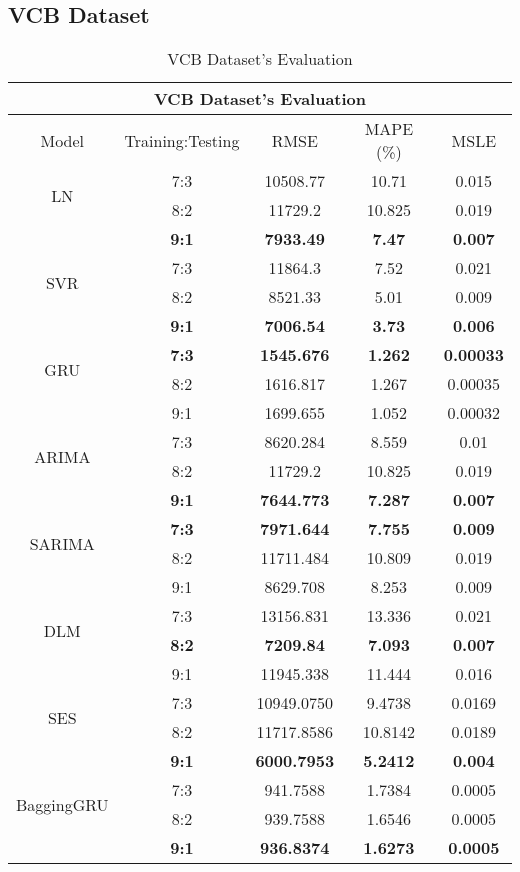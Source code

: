\documentclass{ieeeojies}
\begin{document}
\subsection{VCB Dataset} 
\begin{table}[H]
    \centering
    \begin{tabular}{|c|c|c|c|c|}
         \hline
         \multicolumn{5}{|c|}{\textbf{VCB Dataset's Evaluation}}\\
         \hline
         \centering Model & Training:Testing & RMSE & MAPE (\%) & MSLE\\
         \hline
         \multirow{2}{*}{LN} & 7:3 & 10508.77 & 10.71 & 0.015 \\ & 8:2 & 11729.2 & 10.825 & 0.019 \\ & \textbf{9:1} & \textbf{7933.49} & \textbf{7.47} & \textbf{0.007}\\
         \hline
         \multirow{2}{*}{SVR} & 7:3&11864.3&7.52&0.021\\ & 8:2&8521.33&5.01&0.009 \\ & \textbf{9:1} & \textbf{7006.54} & \textbf{3.73} & \textbf{0.006}\\
         \hline
         \multirow{2}{*}{GRU} & \textbf{7:3}	& \textbf{1545.676} & \textbf{1.262} & \textbf{0.00033} \\ & 8:2 & 1616.817 & 1.267 & 0.00035 \\ & 9:1 & 1699.655  & 1.052 & 0.00032\\
         \hline
         \multirow{2}{*}{ARIMA} & 7:3 &  8620.284 &  8.559 & 0.01 \\ & 8:2 &  11729.2 & 10.825 & 0.019 \\ & \textbf{9:1} & \textbf{7644.773}  & \textbf{7.287} & \textbf{0.007}\\
         \hline
         \multirow{2}{*}{SARIMA} & \textbf{7:3}	& \textbf{7971.644} & \textbf{7.755} & \textbf{0.009} \\ & 8:2 & 11711.484 & 10.809 & 0.019 \\ & 9:1 & 8629.708 & 8.253 & 0.009\\
         \hline
         \multirow{2}{*}{DLM} & 7:3 & 13156.831&13.336 & 0.021 \\ & \textbf{8:2} &	\textbf{7209.84} & \textbf{7.093} & \textbf{0.007} \\ & 9:1 &11945.338	&11.444&0.016\\
         \hline
         \multirow{2}{*}{SES} & 7:3 & 10949.0750 & 9.4738 & 0.0169 \\ & 8:2 & 11717.8586 &10.8142 & 0.0189 \\ & \textbf{9:1} &  	\textbf{6000.7953} &	\textbf{5.2412} & 	\textbf{0.004} \\
         \hline
         \multirow{2}{*}{BaggingGRU} & 7:3 & 941.7588 &  1.7384 &  0.0005 \\ & 8:2 & 939.7588 &  1.6546 &  0.0005 \\ & \textbf{9:1} & \textbf{936.8374} & \textbf{1.6273} & \textbf{0.0005}\\
         \hline
    \end{tabular}
    \caption{VCB Dataset's Evaluation}
    \label{vcbresult}
\end{table}
\end{document}
